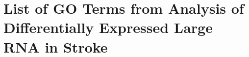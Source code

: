 \chapter{List of GO Terms from Analysis of Differentially Expressed Large RNA in Stroke} 
\label{appendix:go-terms-large-rna}